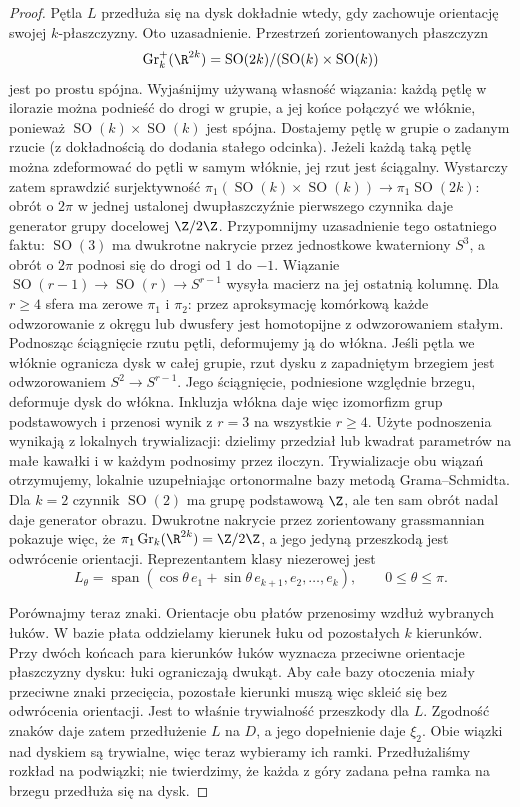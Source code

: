 \begin{proof}
Pętla $L$ przedłuża się na dysk dokładnie wtedy,
gdy zachowuje orientację swojej $k$-płaszczyzny.
Oto uzasadnienie. Przestrzeń zorientowanych płaszczyzn
\[
 \operatorname{Gr}^+_k(\R^{2k})
 =\operatorname{SO}(2k)/(\operatorname{SO}(k)\times
                         \operatorname{SO}(k))
\]
jest po prostu spójna. Wyjaśnijmy używaną własność
wiązania: każdą pętlę w ilorazie można podnieść do
drogi w grupie, a jej końce połączyć we włóknie,
ponieważ $\operatorname{SO}(k)\times\operatorname{SO}(k)$
jest spójna. Dostajemy pętlę w grupie o zadanym rzucie
(z dokładnością do dodania stałego odcinka).
Jeżeli każdą taką pętlę można zdeformować do pętli
w samym włóknie, jej rzut jest ściągalny.
Wystarczy zatem sprawdzić surjektywność
$\pi_1(\operatorname{SO}(k)\times\operatorname{SO}(k))
\to\pi_1\operatorname{SO}(2k)$: obrót o $2\pi$
w jednej ustalonej dwupłaszczyźnie pierwszego czynnika
daje generator grupy docelowej $\Z/2\Z$.
Przypomnijmy uzasadnienie tego ostatniego faktu:
$\operatorname{SO}(3)$ ma dwukrotne nakrycie przez
jednostkowe kwaterniony $S^3$, a obrót o $2\pi$
podnosi się do drogi od $1$ do $-1$.
Wiązanie $\operatorname{SO}(r-1)\to\operatorname{SO}(r)
\to S^{r-1}$ wysyła macierz na jej ostatnią kolumnę.
Dla $r\geq4$ sfera ma zerowe $\pi_1$ i $\pi_2$:
przez aproksymację komórkową każde odwzorowanie z okręgu
lub dwusfery jest homotopijne z odwzorowaniem stałym.
Podnosząc ściągnięcie rzutu pętli, deformujemy ją
do włókna. Jeśli pętla we włóknie ogranicza dysk
w całej grupie, rzut dysku z zapadniętym brzegiem
jest odwzorowaniem $S^2\to S^{r-1}$. Jego ściągnięcie, podniesione
względnie brzegu, deformuje dysk do włókna.
Inkluzja włókna daje więc izomorfizm grup podstawowych
i przenosi wynik z $r=3$ na wszystkie $r\geq4$.
Użyte podnoszenia wynikają z lokalnych trywializacji:
dzielimy przedział lub kwadrat parametrów na małe
kawałki i w każdym podnosimy przez iloczyn.
Trywializacje obu wiązań otrzymujemy, lokalnie
uzupełniając ortonormalne bazy metodą Grama--Schmidta.
Dla $k=2$ czynnik
$\operatorname{SO}(2)$ ma grupę podstawową $\Z$,
ale ten sam obrót nadal daje generator obrazu.
Dwukrotne nakrycie przez zorientowany grassmannian
pokazuje więc, że $\pi_1\operatorname{Gr}_k(\R^{2k})
=\Z/2\Z$, a jego jedyną przeszkodą jest odwrócenie
orientacji. Reprezentantem klasy niezerowej jest
\[
 L_\theta=\operatorname{span}
 (\cos\theta\,e_1+\sin\theta\,e_{k+1},e_2,\ldots,e_k),
 \qquad 0\leq\theta\leq\pi.
\]

Porównajmy teraz znaki. Orientacje obu płatów
przenosimy wzdłuż wybranych łuków. W bazie płata
oddzielamy kierunek łuku od pozostałych $k$ kierunków.
Przy dwóch końcach para kierunków łuków wyznacza
przeciwne orientacje płaszczyzny dysku: łuki
ograniczają dwukąt. Aby całe bazy otoczenia miały
przeciwne znaki przecięcia, pozostałe kierunki
muszą więc skleić się bez odwrócenia orientacji.
Jest to właśnie trywialność przeszkody dla $L$.
Zgodność znaków daje zatem przedłużenie $L$ na $D$,
a jego dopełnienie daje $\xi_2$. Obie wiązki nad
dyskiem są trywialne, więc teraz wybieramy ich ramki.
Przedłużaliśmy rozkład na podwiązki; nie twierdzimy,
że każda z góry zadana pełna ramka na brzegu
przedłuża się na dysk.


\end{proof}
